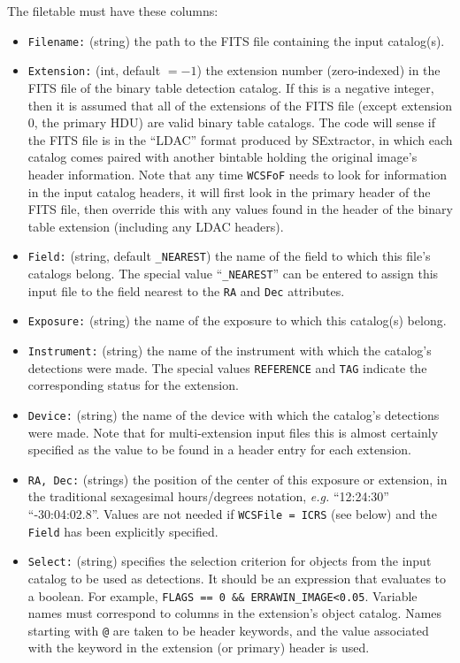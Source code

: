 \documentclass[11pt,preprint,flushrt]{aastex}
\begin{document}
The filetable must have these columns:
\begin{itemize}
\item {\tt Filename:} (string) the path to the FITS file containing the input catalog(s).
\item {\tt Extension:} (int, default $=-1$) the extension number (zero-indexed) in the FITS file of the binary table detection catalog.  If this is a negative integer, then it is assumed that all of the extensions of the FITS file (except extension 0, the primary HDU) are valid binary table catalogs.  The code will sense if the FITS file is in the ``LDAC'' format produced by SExtractor, in which each catalog comes paired with another bintable holding the original image's header information.  Note that any time {\tt WCSFoF} needs to look for information in the input catalog headers, it will first look in the primary header of the FITS file, then override this with any values found in the header of the binary table extension (including any LDAC headers).
\item {\tt Field:} (string, default {\tt \_NEAREST}) the name of the field to which this file's catalogs belong.  The special value ``{\tt \_NEAREST}'' can be entered to assign this input file to the field nearest to the {\tt RA} and {\tt Dec} attributes.
\item {\tt Exposure:} (string) the name of the exposure to which this catalog(s) belong.
\item {\tt Instrument:} (string) the name of the instrument with which the catalog's detections were made.  The special values {\tt REFERENCE} and {\tt TAG} indicate the corresponding status for the extension.
\item {\tt Device:} (string) the name of the device with which the catalog's detections were made.  Note that for multi-extension input files this is almost certainly specified as the value to be found in a header entry for each extension.
\item {\tt RA, Dec:} (strings) the position of the center of this exposure or extension, in the traditional sexagesimal hours/degrees notation, {\it e.g.\/} ``12:24:30''  ``-30:04:02.8''.   Values are not needed if {\tt WCSFile = ICRS} (see below) and the {\tt Field} has been explicitly specified.
\item {\tt Select:} (string) specifies the selection criterion for objects from the input catalog to be used as detections.  It should be an expression that evaluates to a boolean.  For example, {\tt FLAGS == 0 \&\& ERRAWIN\_IMAGE<0.05}.  Variable names must correspond to columns in the extension's object catalog.  Names starting with {\tt @} are taken to be header keywords, and the value associated with the keyword in the extension (or primary) header is used.

\end{itemize}
\end{document}
